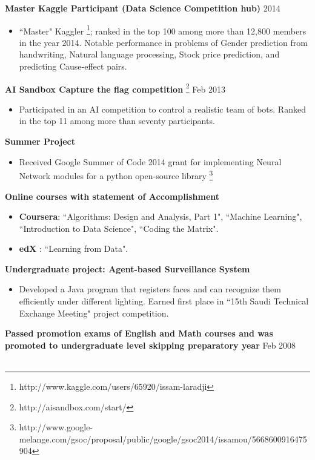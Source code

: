 \documentclass[10pt]{article}
\newenvironment{innerlist}[1][\enskip\textbullet]%
        {\begin{itemize}[#1,leftmargin=*,parsep=0pt,itemsep=0pt,topsep=0pt,partopsep=0pt]}
        {\end{itemize}}
\begin{document}
\textbf{Master Kaggle Participant (Data Science Competition hub)} \hfill   {2014}
\begin{innerlist}
\item ``Master" Kaggler \footnote{http://www.kaggle.com/users/65920/issam-laradji}; ranked in the top 100 among more than 12,800 members in the year 2014. Notable performance in problems of Gender prediction from handwriting, Natural language processing,  Stock price prediction, and predicting Cause-effect pairs.


\end{innerlist}
\vspace{0.2in}
\textbf{AI Sandbox Capture the flag competition} \footnote{http://aisandbox.com/start/} \hfill   { Feb 2013}
\begin{innerlist}
\item Participated in an AI competition  to control a realistic team of bots. Ranked in the top 11 among more than seventy participants.

\end{innerlist}
\vspace{0.2in}
\textbf{Summer Project} 
\begin{innerlist}
\item Received Google Summer of Code 2014 grant for implementing Neural Network modules for a python open-source library \footnote{http://www.google-melange.com/gsoc/proposal/public/google/gsoc2014/issamou/5668600916475904}
\end{innerlist}
\vspace{0.2in}
\textbf{Online courses with statement of Accomplishment } 
\begin{innerlist}
\item {\bf Coursera}: ``Algorithms: Design and Analysis, Part 1", ``Machine Learning", \\``Introduction to Data Science", ``Coding the Matrix".
\item {\bf edX }:  ``Learning from Data".

  \end{innerlist}
  \vspace{0.2in}
\textbf{Undergraduate project: Agent-based Surveillance System} 
\begin{innerlist}
\item Developed a Java program that registers faces and can recognize them efficiently under different lighting. Earned first place in ``15th Saudi Technical Exchange Meeting" project competition.\\
  \end{innerlist}
{\bf Passed promotion exams of English and Math courses and was promoted to undergraduate level skipping preparatory year}\hfill   { Feb 2008 }\\\\
\end{document}
